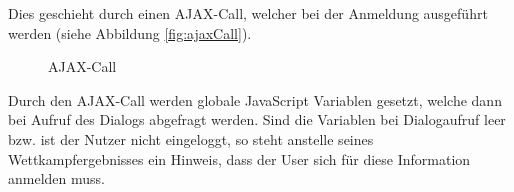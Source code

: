 Dies geschieht durch einen AJAX-Call, welcher bei der Anmeldung ausgeführt werden (siehe Abbildung \vref{fig:ajaxCall}).

\begin{figure}[!h]
	\caption{AJAX-Call}
	\label{fig:ajaxCall}
\end{figure}

Durch den AJAX-Call werden globale JavaScript Variablen gesetzt, welche dann bei Aufruf des Dialogs abgefragt werden. Sind die Variablen bei Dialogaufruf leer bzw. ist der Nutzer nicht eingeloggt, so steht anstelle seines Wettkampfergebnisses ein Hinweis, dass der User sich für diese Information anmelden muss.

